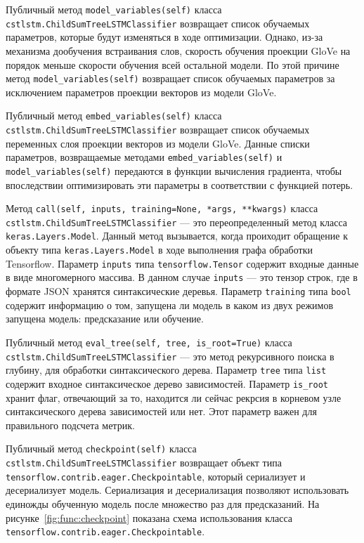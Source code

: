 Публичный метод \texttt{model\_variables(self)} класса \texttt{cstlstm.ChildSum\-TreeLSTMClassifier} возвращает список обучаемых параметров, которые будут изменяться в ходе оптимизации. Однако, из-за механизма дообучения встраивания слов, скорость обучения проекции GloVe на порядок меньше скорости обучения всей остальной модели. По этой причине метод \texttt{model\_va\-riables(self)} возвращает список обучаемых параметров за исключением параметров проекции векторов из модели GloVe.

Публичный метод \texttt{embed\_variables(self)} класса \texttt{cstlstm.ChildSum\-TreeLSTMClassifier} возвращает список обучаемых переменных слоя проекции векторов из модели GloVe. Данные списки параметров, возвращаемые методами \texttt{embed\_variables(self)} и \texttt{model\_variables(self)} передаются в функции вычисления градиента, чтобы впоследствии оптимизировать эти параметры в соответствии с функцией потерь.

Метод \texttt{call(self, inputs, training=None, *args, **kwargs)} класса \texttt{cstlstm.ChildSumTreeLSTMClassifier} --- это переопределенный метод класса \texttt{keras.Layers.Model}. Данный метод вызывается, когда проиходит обращение к объекту типа \texttt{keras.Layers.Model} в ходе выполнения графа обработки Tensorflow. Параметр \texttt{inputs} типа \texttt{tensorflow.Tensor} содержит входные данные в виде многомерного массива. В данном случае \texttt{inputs} --- это тензор строк, где в формате JSON хранятся синтаксические деревья. Параметр \texttt{training} типа \texttt{bool} содержит информацию о том, запущена ли модель в каком из двух режимов запущена модель: предсказание или обучение.

Публичный метод \texttt{eval\_tree(self, tree, is\_root=True)} класса \texttt{cst\-lstm.ChildSumTreeLSTMClassifier} --- это метод рекурсивного поиска в глубину, для обработки синтаксического дерева. Параметр \texttt{tree} типа \texttt{list} содержит входное синтаксическое дерево зависимостей. Параметр \texttt{is\_root} хранит флаг, отвечающий за то, находится ли сейчас рекрсия в корневом узле синтаксического дерева зависимостей или нет. Этот параметр важен для правильного подсчета метрик.

Публичный метод \texttt{checkpoint(self)} класса \texttt{cstlstm.ChildSumTree\-LSTMClassifier} возвращает объект типа \texttt{tensorflow.contrib.eager.Che\-ckpointable}, который сериализует и десериализует модель. Сериализация и десериализация позволяют использовать единожды обученную модель после множество раз для предсказаний. На рисунке~\ref{fig:func:checkpoint} показана схема использования класса \texttt{tensorflow.contrib.eager.Checkpointable}.


